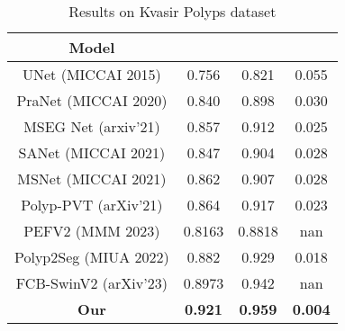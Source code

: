\documentclass[conference]{IEEEtran}
\begin{document}
\begin{table}[H]
\begin{center}
\begin{tabular}{|c| c | c| c|} 
 \hline
 Model &  &  &  \\ [0.5ex] 
 \hline
 UNet (MICCAI 2015) \cite{unet} & 0.756 & 0.821 & 0.055 \\
PraNet (MICCAI 2020) \cite{pranet}  & 0.840 & 0.898 & 0.030 \\
MSEG Net (arxiv'21) \cite{mseg} & 0.857 & 0.912 & 0.025 \\

SANet (MICCAI 2021) \cite{sanet} & 0.847 & 0.904 & 0.028 \\

MSNet (MICCAI 2021) \cite{MSNet} & 0.862 & 0.907 & 0.028 \\

Polyp-PVT (arXiv'21) \cite{pvt} &  0.864 & 0.917 & 0.023\\

PEFV2 (MMM 2023) \cite{pefmmm} & 0.8163 & 0.8818 & nan \\

Polyp2Seg (MIUA 2022) \cite{polyp2seg} & 0.882 & 0.929 & 0.018\\

FCB-SwinV2 (arXiv'23) \cite{fcb} & 0.8973 & 0.942 & nan \\
\hline

\textbf{Our} & \textbf{0.921} & \textbf{0.959} & \textbf{0.004} \\

 \hline
\end{tabular}
\end{center}
\caption{Results on Kvasir Polyps dataset \cite{jha2020medico}}
\label{tab:tab1}
\end{table}
\end{document}
